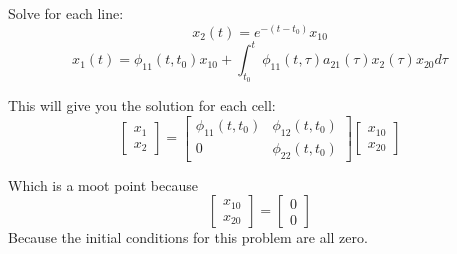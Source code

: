 \documentclass[12pt]{article}
\begin{document}
Solve for each line:
$$x_2(t)=e^{-(t-t_0)}x_{10}$$
$$x_1(t)=\phi_{11}(t,t_0)x_{10}+\int_{t_0}^{t}\phi_{11}(t,\tau)a_{21}(\tau)x_2(\tau)x_{20}d\tau$$

This will give you the solution for each cell:
$$\begin{bmatrix} x_1 \\
x_2
\end{bmatrix} = \begin{bmatrix} \phi_{11}(t,t_0) & \phi_{12}(t,t_0) \\
0 & \phi_{22}(t,t_0)
\end{bmatrix} \begin{bmatrix} x_{10} \\
x_{20}
\end{bmatrix} $$

Which is a moot point because 
$$\begin{bmatrix} x_{10} \\
x_{20}
\end{bmatrix} = \begin{bmatrix} 0 \\
0
\end{bmatrix} $$
Because the initial conditions for this problem are all zero.
\end{document}
